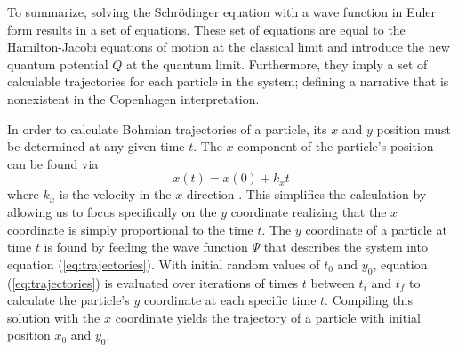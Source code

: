 \documentclass[10pt, reqno]{article}
\begin{document}
  To summarize, solving the Schrödinger equation with a wave function in Euler form results in a set of equations.
  These set of equations are equal to the Hamilton-Jacobi equations of motion at the classical limit 
    and introduce the new quantum potential $Q$ at the quantum limit.
  Furthermore, they imply a set of calculable trajectories for each particle in the system;
    defining a narrative that is nonexistent in the Copenhagen interpretation.

  In order to calculate Bohmian trajectories of a particle, its $x$ and $y$ position must be determined at any given time $t$.
  The $x$ component of the particle's position can be found via 
  \begin{equation}
    x(t) = x(0) + k_x t 
  \end{equation}
  where $k_x$ is the velocity in the $x$ direction \cite{guay}.
  This simplifies the calculation by allowing us to focus specifically on the $y$ coordinate realizing that 
    the $x$ coordinate is simply proportional to the time $t$.
  The $y$ coordinate of a particle at time $t$ is found by feeding the wave function $\Psi$ that describes the system into equation (\ref{eq:trajectories}).
  With initial random values of $t_0$ and $y_0$, equation (\ref{eq:trajectories}) is evaluated over iterations of times $t$ between $t_i$ and $t_f$ to calculate the 
    particle's $y$ coordinate at each specific time $t$.
  Compiling this solution with the $x$ coordinate yields the trajectory of a particle with initial position $x_0$ and $y_0$.
  
\end{document}
